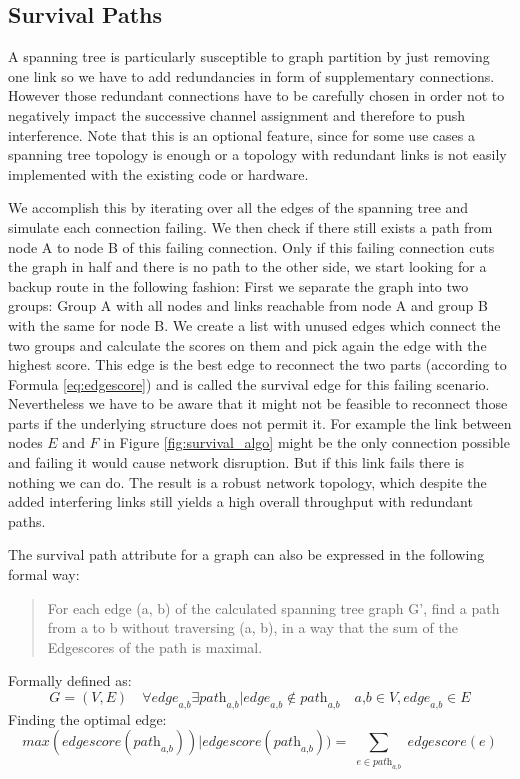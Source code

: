     \subsection{Survival Paths}
      A spanning tree is particularly susceptible to graph partition by just removing one link so we have to add redundancies in form of supplementary connections.
      However those redundant connections have to be carefully chosen in order not to negatively impact the successive channel assignment and therefore to push interference.
      Note that this is an optional feature,
      since for some use cases a spanning tree topology is enough or a topology with redundant links is not easily implemented with the existing code or hardware.  
      
      We accomplish this by iterating over all the edges of the spanning tree and simulate each connection failing. 
      We then check if there still exists a path from node A to node B of this failing connection. 
      Only if this failing connection cuts the graph in half and there is no path to the other side,
      we start looking for a backup route in the following fashion:
      First we separate the graph into two groups: Group A with all nodes and links reachable from node A and group B with the same for node B.
      We create a list with unused edges which connect the two groups and calculate the scores on them and pick again the edge with the highest score.
      This edge is the best edge to reconnect the two parts (according to Formula \ref{eq:edgescore}) and is called the survival edge for this failing scenario.
      Nevertheless we have to be aware that it might not be feasible to reconnect those parts if the underlying structure does not permit it.
      For example the link between nodes \(E\) and \(F\) in Figure \ref{fig:survival_algo} might be the only connection possible and failing it would cause network disruption.
      But if this link fails there is nothing we can do.
      The result is a robust network topology, which despite the added interfering links still yields a high overall throughput with redundant paths.

      The survival path attribute for a graph can also be expressed in the following formal way:
      \begin{quote}
	For each edge (a, b) of the calculated spanning tree graph G', find a path from a to b without traversing (a, b), 
	in a way that the sum of the Edgescores of the path is maximal.
      \end{quote}
      Formally defined as:
      $$\textit{G}=(\textit{V},\textit{E}) \quad
	\forall \textit{edge}_\textit{a,b} \exists \textit{path}_\textit{a,b} | \textit{edge}_\textit{a,b} \notin \textit{path}_\textit{a,b} \quad
	\textit{a,b} \in \textit{V}, \textit{edge}_\textit{a,b} \in \textit{E}$$
	Finding the optimal edge:
	$$\textit{max}(\textit{edgescore}(\textit{path}_\textit{a,b})) |
	\textit{edgescore}(\textit{path}_\textit{a,b})) = \sum_{\substack{e \in \textit{path}_\textit{a,b}}} \textit{edgescore}(e)$$
	
